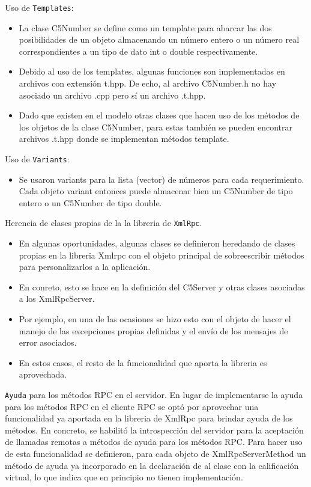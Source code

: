 \documentclass[a4paper,12pt]{article}
\begin{document}
Uso de  \texttt{Templates}:

\begin{itemize}
    \item La clase C5Number se define como un template para abarcar las dos posibilidades de un objeto almacenando un número entero o un número real correspondientes a un tipo de dato int o double respectivamente.
    \item Debido al uso de los templates, algunas funciones son implementadas en archivos con extensión t.hpp. De echo, al archivo C5Number.h no hay asociado un archivo .cpp pero sí un archivo .t.hpp.
    \item Dado que existen en el modelo otras clases que hacen uso de los métodos de los objetos de la clase C5Number, para estas también se pueden encontrar archivos .t.hpp donde se implementan métodos template.
\end{itemize}

Uso de \texttt{Variants}:

\begin{itemize}
    \item Se usaron variants para la lista (vector) de números para cada requerimiento. Cada objeto variant entonces puede almacenar bien un C5Number de tipo entero o un C5Number de tipo double.
\end{itemize}

Herencia de clases propias de la la libreria de \texttt{XmlRpc}.
\begin{itemize}
    \item En algunas oportunidades, algunas clases se definieron heredando de clases propias en la libreria Xmlrpc con el objeto principal de sobreescribir métodos para personalizarlos a la aplicación.
    \item En conreto, esto se hace en la definición del C5Server y otras clases asociadas a los XmlRpcServer.
    \item Por ejemplo, en una de las ocasiones se hizo esto con el objeto de hacer el manejo de las excepciones propias definidas y el envío de los mensajes de error asociados.
    \item En estos casos, el resto de la funcionalidad que aporta la libreria es aprovechada.
\end{itemize}

\texttt{Ayuda} para los métodos RPC en el servidor.
En lugar de implementarse la ayuda para los métodos RPC en el cliente RPC se optó por aprovechar una funcionalidad ya aportada en la libreria de XmlRpc para brindar ayuda de los métodos.
En concreto, se habilitó la introspección del servidor para la aceptación de llamadas remotas a métodos de ayuda para los métodos RPC.
Para hacer uso de esta funcionalidad se definieron, para cada objeto de XmlRpcServerMethod un método de ayuda ya incorporado en la declaración de al clase con la calificación virtual,
lo que indica que en principio no tienen implementación.
\end{document}
